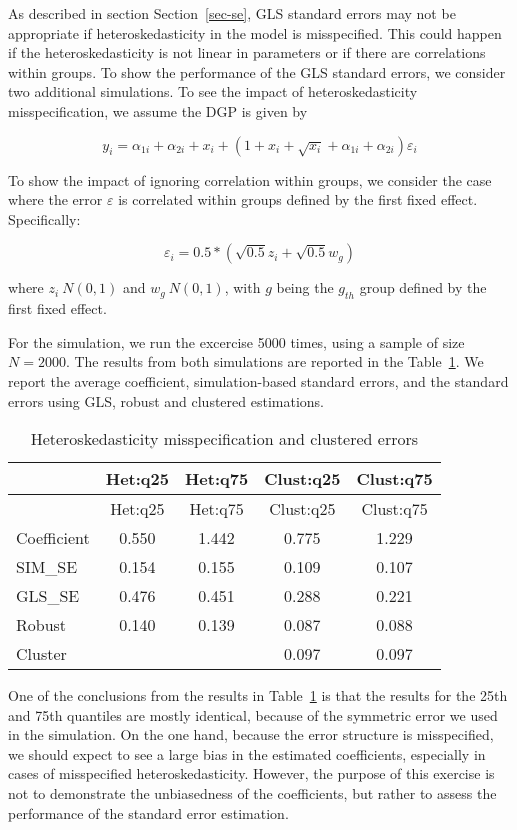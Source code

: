 \documentclass[
  authoryear,
  review,
  1p]{elsarticle}
\begin{document}
As described in section Section~\ref{sec-se}, GLS standard errors may
not be appropriate if heteroskedasticity in the model is misspecified.
This could happen if the heteroskedasticity is not linear in parameters
or if there are correlations within groups. To show the performance of
the GLS standard errors, we consider two additional simulations. To see
the impact of heteroskedasticity misspecification, we assume the DGP is
given by

\[y_i = \alpha_{1i} + \alpha_{2i} + x_i + (1+x_i + \sqrt{x_i} +\alpha_{1i} + \alpha_{2i} ) \varepsilon_i
\]

To show the impact of ignoring correlation within groups, we consider
the case where the error \(\varepsilon\) is correlated within groups
defined by the first fixed effect. Specifically:

\[\varepsilon_i =0.5*(\sqrt{0.5} z_i + \sqrt{0.5} w_g)\]

where \(z_i~N(0,1)\) and \(w_g~N(0,1)\), with \(g\) being the \(g_{th}\)
group defined by the first fixed effect.

For the simulation, we run the excercise 5000 times, using a sample of
size \(N=2000\). The results from both simulations are reported in the
Table~\ref{tbl-sim2}. We report the average coefficient,
simulation-based standard errors, and the standard errors using GLS,
robust and clustered estimations.

\begin{longtable}[]{@{}lcccc@{}}
\caption{Heteroskedasticity misspecification and clustered
errors}\label{tbl-sim2}\tabularnewline
\toprule\noalign{}
& Het:q25 & Het:q75 & Clust:q25 & Clust:q75 \\
\midrule\noalign{}
\endfirsthead
\toprule\noalign{}
& Het:q25 & Het:q75 & Clust:q25 & Clust:q75 \\
\midrule\noalign{}
\endhead
\bottomrule\noalign{}
\endlastfoot
Coefficient & 0.550 & 1.442 & 0.775 & 1.229 \\
SIM\_SE & 0.154 & 0.155 & 0.109 & 0.107 \\
GLS\_SE & 0.476 & 0.451 & 0.288 & 0.221 \\
Robust & 0.140 & 0.139 & 0.087 & 0.088 \\
Cluster & & & 0.097 & 0.097 \\
\end{longtable}

One of the conclusions from the results in Table~\ref{tbl-sim2} is that
the results for the 25th and 75th quantiles are mostly identical,
because of the symmetric error we used in the simulation. On the one
hand, because the error structure is misspecified, we should expect to
see a large bias in the estimated coefficients, especially in cases of
misspecified heteroskedasticity. However, the purpose of this exercise
is not to demonstrate the unbiasedness of the coefficients, but rather
to assess the performance of the standard error estimation.
\end{document}
